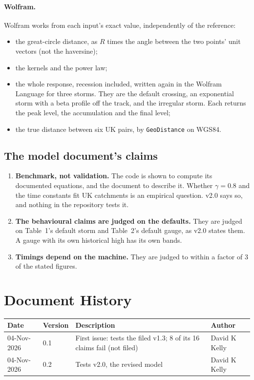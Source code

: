\documentclass[11pt,a4paper]{article}
\renewcommand{\mkmhistorypage}[1]{%
    \section{Document History}
    \begin{table}[ht]
        \centering
        \begin{tabular}{l|l|p{9cm}|l}
            \textbf{Date} & \textbf{Version} & \textbf{Description} & \textbf{Author} \\
            \hline
            #1
        \end{tabular}
    \end{table}
}
\begin{document}
\paragraph{Wolfram.} Wolfram works from each input's exact value, independently of the
reference:
\begin{itemize}[leftmargin=*,nosep]
\item the great-circle distance, as $R$ times the angle between the two points' unit
  vectors (not the haversine);
\item the kernels and the power law;
\item the whole response, recession included, written again in the Wolfram Language for
  three storms. They are the default crossing, an exponential storm with a beta profile
  off the track, and the irregular storm. Each returns the peak level, the accumulation
  and the final level;
\item the true distance between six UK pairs, by \texttt{GeoDistance} on WGS84.
\end{itemize}

\mkmvalidation



\subsection{The model document's claims}


\mkmlimitations

\begin{enumerate}[leftmargin=*]
\item \textbf{Benchmark, not validation.} The code is shown to compute its documented
  equations, and the document to describe it. Whether $\gamma=0.8$ and the time
  constants fit UK catchments is an empirical question. v2.0 says so, and nothing in
  the repository tests it.
\item \textbf{The behavioural claims are judged on the defaults.} They are judged on
  Table~1's default storm and Table~2's default gauge, as v2.0 states them. A gauge
  with its own historical high has its own bands.
\item \textbf{Timings depend on the machine.} They are judged to within a factor of 3
  of the stated figures.
\end{enumerate}

\mkmhistorypage{04-Nov-2026 & 0.1 & First issue: tests the filed v1.3; 8 of its 16 claims fail (not filed) & David K Kelly \\
04-Nov-2026 & 0.2 & Tests v2.0, the revised model & David K Kelly \\}
\end{document}
